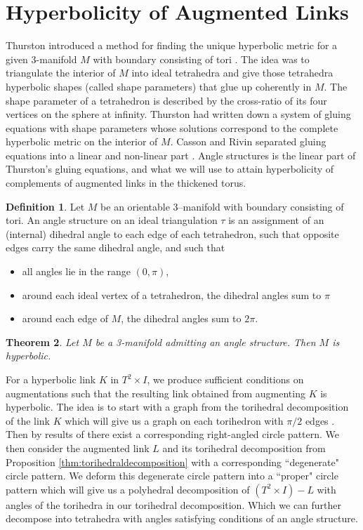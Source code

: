 \documentclass[11pt]{amsart}
\theoremstyle{plain}
\newtheorem{theorem}{Theorem}[section]
\theoremstyle{definition}
\newtheorem{define}[theorem]{Definition}
\begin{document}
\section{Hyperbolicity of Augmented Links}
Thurston introduced a method for finding the unique hyperbolic metric for a given 3-manifold $M$ with boundary consisting of tori \cite{Thurston}. The idea was to triangulate the interior of $M$ into ideal tetrahedra and give those tetrahedra hyperbolic shapes (called shape parameters) that glue up coherently in $M$. The shape parameter of a tetrahedron is described by the cross-ratio of its four vertices on the sphere at infinity. Thurston had written down a system of gluing equations with shape parameters whose solutions correspond to the complete hyperbolic metric on the interior of $M$. Casson and Rivin separated gluing equations into a linear and non-linear part \cite{Casson-Rivin}. Angle structures is the linear part of Thurston's gluing equations, and what we will use to attain hyperbolicity of complements of augmented links in the thickened torus. 

\begin{define}
Let $M$ be an orientable 3–manifold with boundary consisting of tori. An angle structure on an ideal triangulation $\tau$ is an assignment of an (internal) dihedral angle to each edge of each tetrahedron, such that opposite
edges carry the same dihedral angle, and such that
\begin{itemize}
\item all angles lie in the range $(0,\pi)$,
\item around each ideal vertex of a tetrahedron, the dihedral angles sum to $\pi$
\item around each edge of $M$, the dihedral angles sum to $2\pi$.
\end{itemize}
\end{define}

\begin{theorem}\cite{Casson-Rivin}\label{thm:Casson-Rivin}
Let $M$ be a 3-manifold admitting an angle structure. Then $M$ is hyperbolic.
\end{theorem}

For a hyperbolic link $K$ in $T^2 \times I$, we produce sufficient conditions on augmentations such that the resulting link obtained from augmenting $K$ is hyperbolic. The idea is to start with a graph from the torihedral decomposition of the link $K$ which will give us a graph on each torihedron with $\pi/2$ edges \cite{CKP2}. Then by results of \cite{BandS} there exist a corresponding right-angled circle pattern. We then consider the augmented link $L$ and its torihedral decomposition from Proposition \ref{thm:torihedraldecomposition} with a corresponding ``degenerate" circle pattern. We deform this degenerate circle pattern into a ``proper" circle pattern which will give us a polyhedral decomposition of $(T^2 \times I)-L$ with angles of the torihedra in our torihedral decomposition. Which we can further decompose into tetrahedra with angles satisfying conditions of an angle structure. 
\end{document}
